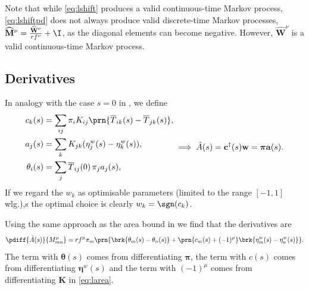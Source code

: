 \documentclass[12pt]{article}
\newcommand{\eqm}{\pi}
\newcommand{\eq}{\boldsymbol{\eqm}}
\newcommand{\fptm}{T}
\newcommand{\fptbm}{\overline{\fptm}}
\newcommand{\etwm}{\eta^w}
\newcommand{\etw}{\boldsymbol{\eta}^w}
\newcommand{\thbm}{\theta}
\newcommand{\thb}{\boldsymbol{\thbm}}
\newcommand{\wm}{w}
\newcommand{\w}{\mathbf{\wm}}
\newcommand{\Wm}{W}
\newcommand{\W}{\mathbf{\Wm}}
\newcommand{\MMdm}{M}
\newcommand{\MMd}{\mathbf{\MMdm}}
\newcommand{\encm}{K}
\newcommand{\enc}{\mathbf{\encm}}
\newcommand{\shift}[1]{\widehat{#1}}
\begin{document}
Note that while \cref{eq:lshift} produces a valid continuous-time Markov process, \cref{eq:lshiftpd} does not always produce valid discrete-time Markov processes, \( \shift{\MMd}^\nu = \frac{\shift{\W}^\nu}{rf^\nu} + \I \), as the diagonal elements can become negative.
However, \(\shift{\W}^\nu \) is a valid continuous-time Markov process.


\subsection{Derivatives}\label{sec:lderiv}

In analogy with the case \(s=0\) in \cite{Lahiri2013synapse}, we define
%
\begin{equation}\label{eq:lareacoeffs}
  \begin{aligned}
    {c}_k(s) &= \sum_{ij} \eqm_i \encm_{ij} \prn{\fptbm_{ik}(s)-\fptbm_{jk}(s)}, \\
    {a}_j(s) &= \sum_{k} \encm_{jk} (\etwm_{j}(s) - \etwm_{k}(s)), \\
    \thbm_i(s) &= \sum_j \fptbm_{ij}(0)\, \eqm_j {a}_j(s), \\
  \end{aligned}
    \implies
    \hat{A}(s) 
      = \mathbf{c}^\dag(s) \w
      = \eq \mathbf{a}(s).
\end{equation}
%
If we regard the \(\wm_k\) as optimisable parameters (limited to the range \( [-1,1] \) wlg.),s the optimal choice is clearly \( \wm_k = \sgn(c_k) \).

Using the same approach as the area bound in \cite{Lahiri2013synapse} we find that the derivatives are
%
\begin{equation}\label{eq:lAdiff}
  \pdiff{\hat{A}(s)}{\MMdm^\mu_{mn}}
     = rf^\mu \eqm_m \prn{ \brk{\thbm_m(s) - \thbm_n(s)}
     +\prn{{c}_m(s) + (-1)^\mu} \brk{\etwm_m(s) - \etwm_n(s)} }.
\end{equation}
%
The term with \(\thb(s)\) comes from differentiating \(\eq\), the term with \(c(s)\) comes from differentiating \(\etw(s)\) and the term with \((-1)^\mu\) comes from differentiating \(\enc\) in \eqref{eq:larea}.
\end{document}
